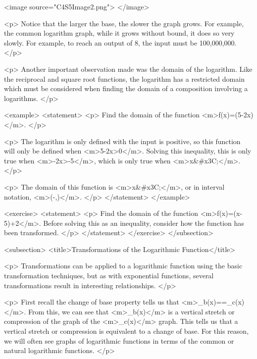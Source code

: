         <image source="C4S5Image2.png">
        </image>

        <p>
            Notice that the larger the base, the slower the graph grows.
            For example, the common logarithm graph, while it grows without bound, it does so very slowly.
            For example, to reach an output of 8, the input must be 100,000,000.
        </p>

        <p>
            Another important observation made was the domain of the logarithm.
            Like the reciprocal and square root functions, the logarithm has a restricted domain which must be considered when finding the domain of a composition involving a logarithms.
        </p>

        <example>
            <statement>
                <p>
                    Find the domain of the function <m>f(x)=\log(5-2x)</m>.
                </p>

                <p>
                    The logarithm is only defined with the input is positive, so this function will only be defined when <m>5-2x>0</m>.
                    Solving this inequality, this is only true when <m>-2x>-5</m>, which is only true when <m>x&#x3C;</m>.
                </p>

                <p>
                    The domain of this function is <m>x&#x3C;</m>, or in interval notation, <m>(-\infty,)</m>.
                </p>
            </statement>
        </example>

        <exercise>
            <statement>
                <p>
                    Find the domain of the function <m>f(x)=\log(x-5)+2</m>.
                    Before solving this as an inequality, consider how the function has been transformed.
                </p>
            </statement>
        </exercise>
    </subsection>


    <subsection>
        <title>Transformations of the Logarithmic Function</title>

        <p>
            Transformations can be applied to a logarithmic function using the basic transformation techniques, but as with exponential functions, several transformations result in interesting relationships.
        </p>

        <p>
            First recall the change of base property tells us that <m>\log_{b}(x)==\log_{c}(x)</m>.
            From this, we can see that <m>\log_{b}(x)</m> is a vertical stretch or compression of the graph of the <m>\log_{c}(x)</m> graph.
            This tells us that a vertical stretch or compression is equivalent to a change of base.
            For this reason, we will often see graphs of logarithmic functions in terms of the common or natural logarithmic functions.
        </p>

